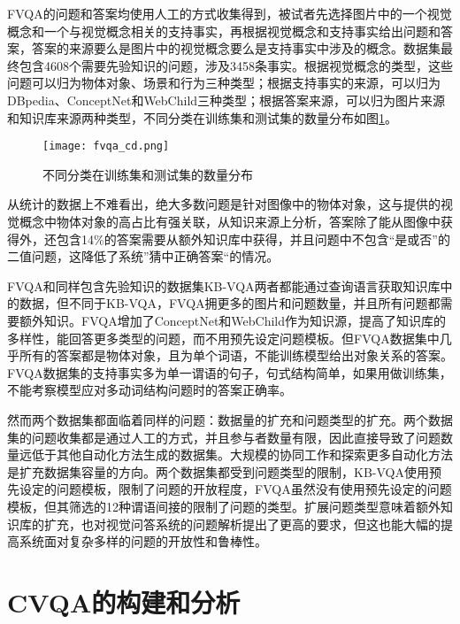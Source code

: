 FVQA的问题和答案均使用人工的方式收集得到，被试者先选择图片中的一个视觉概念和一个与视觉概念相关的支持事实，再根据视觉概念和支持事实给出问题和答案，答案的来源要么是图片中的视觉概念要么是支持事实中涉及的概念。数据集最终包含4608个需要先验知识的问题，涉及3458条事实。根据视觉概念的类型，这些问题可以归为物体对象、场景和行为三种类型；根据支持事实的来源，可以归为DBpedia、ConceptNet和WebChild三种类型；根据答案来源，可以归为图片来源和知识库来源两种类型，不同分类在训练集和测试集的数量分布如图\ref{fvqa_cd}。
\begin{figure}[H]
	\centering
	\texttt{[image: fvqa\_cd.png]}
	\caption{不同分类在训练集和测试集的数量分布}
	\label{fvqa_cd}
\end{figure}

从统计的数据上不难看出，绝大多数问题是针对图像中的物体对象，这与提供的视觉概念中物体对象的高占比有强关联，从知识来源上分析，答案除了能从图像中获得外，还包含14\%的答案需要从额外知识库中获得，并且问题中不包含“是或否”的二值问题，这降低了系统”猜中正确答案“的情况。

FVQA和同样包含先验知识的数据集KB-VQA两者都能通过查询语言获取知识库中的数据，但不同于KB-VQA，FVQA拥更多的图片和问题数量，并且所有问题都需要额外知识。FVQA增加了ConceptNet和WebChild作为知识源，提高了知识库的多样性，能回答更多类型的问题，而不用预先设定问题模板。但FVQA数据集中几乎所有的答案都是物体对象，且为单个词语，不能训练模型给出对象关系的答案。FVQA数据集的支持事实多为单一谓语的句子，句式结构简单，如果用做训练集，不能考察模型应对多动词结构问题时的答案正确率。

然而两个数据集都面临着同样的问题：数据量的扩充和问题类型的扩充。两个数据集的问题收集都是通过人工的方式，并且参与者数量有限，因此直接导致了问题数量远低于其他自动化方法生成的数据集。大规模的协同工作和探索更多自动化方法是扩充数据集容量的方向。两个数据集都受到问题类型的限制，KB-VQA使用预先设定的问题模板，限制了问题的开放程度，FVQA虽然没有使用预先设定的问题模板，但其筛选的12种谓语间接的限制了问题的类型。扩展问题类型意味着额外知识库的扩充，也对视觉问答系统的问题解析提出了更高的要求，但这也能大幅的提高系统面对复杂多样的问题的开放性和鲁棒性。

\section{CVQA的构建和分析}


